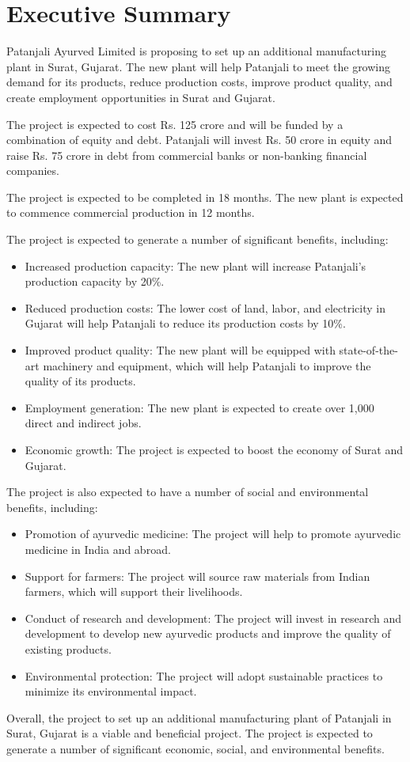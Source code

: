 \section*{Executive Summary}
Patanjali Ayurved Limited is proposing to set up an additional manufacturing plant in Surat, Gujarat. The new plant will help Patanjali to meet the growing demand for its products, reduce production costs, improve product quality, and create employment opportunities in Surat and Gujarat.

The project is expected to cost Rs. 125 crore and will be funded by a combination of equity and debt. Patanjali will invest Rs. 50 crore in equity and raise Rs. 75 crore in debt from commercial banks or non-banking financial companies.

The project is expected to be completed in 18 months. The new plant is expected to commence commercial production in 12 months.

The project is expected to generate a number of significant benefits, including:

\begin{itemize}
    \item Increased production capacity: The new plant will increase Patanjali's production capacity by 20\%.
    \item Reduced production costs: The lower cost of land, labor, and electricity in Gujarat will help Patanjali to reduce its production costs by 10\%.
    \item Improved product quality: The new plant will be equipped with state-of-the-art machinery and equipment, which will help Patanjali to improve the quality of its products.
    \item Employment generation: The new plant is expected to create over 1,000 direct and indirect jobs.
    \item Economic growth: The project is expected to boost the economy of Surat and Gujarat.
\end{itemize}

The project is also expected to have a number of social and environmental benefits, including:

\begin{itemize}
    \item Promotion of ayurvedic medicine: The project will help to promote ayurvedic medicine in India and abroad.
    \item Support for farmers: The project will source raw materials from Indian farmers, which will support their livelihoods.
    \item Conduct of research and development: The project will invest in research and development to develop new ayurvedic products and improve the quality of existing products.
    \item Environmental protection: The project will adopt sustainable practices to minimize its environmental impact.
\end{itemize}

Overall, the project to set up an additional manufacturing plant of Patanjali in Surat, Gujarat is a viable and beneficial project. The project is expected to generate a number of significant economic, social, and environmental benefits.

